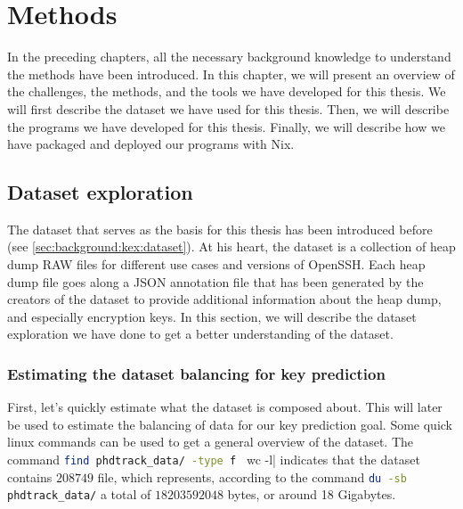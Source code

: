 \chapter{Methods}\label{chap:methods}


In the preceding chapters, all the necessary background knowledge to understand the methods have been introduced. In this chapter, we will present an overview of the challenges, the methods, and the tools we have developed for this thesis. We will first describe the dataset we have used for this thesis. Then, we will describe the programs we have developed for this thesis. Finally, we will describe how we have packaged and deployed our programs with Nix.



\section{Dataset exploration}
The dataset that serves as the basis for this thesis has been introduced before (see \autoref{sec:background:kex:dataset}). At his heart, the dataset is a collection of heap dump RAW files for different use cases and versions of OpenSSH. Each heap dump file goes along a JSON annotation file that has been generated by the creators of the dataset to provide additional information about the heap dump, and especially encryption keys. In this section, we will describe the dataset exploration we have done to get a better understanding of the dataset. 

    \subsection{Estimating the dataset balancing for key prediction}
    First, let's quickly estimate what the dataset is composed about. This will later be used to estimate the balancing of data for our key prediction goal. Some quick linux commands can be used to get a general overview of the dataset. The command \lstinline[language=bash]|find phdtrack_data/ -type f | wc -l| indicates that the dataset contains $ 208749 $ file, which represents, according to the command \lstinline[language=bash]|du -sb phdtrack_data/| a total of $ 18203592048 $ bytes, or around 18 Gigabytes.

